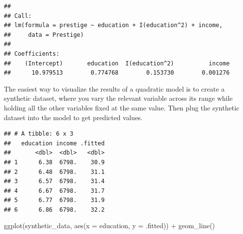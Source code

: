 \documentclass[
  12pt,
  oneside,openany]{book}
\newenvironment{Shaded}{\begin{snugshade}}{\end{snugshade}}
\newcommand{\AttributeTok}[1]{\textcolor[rgb]{0.77,0.63,0.00}{#1}}
\newcommand{\DecValTok}[1]{\textcolor[rgb]{0.00,0.00,0.81}{#1}}
\newcommand{\FunctionTok}[1]{\textcolor[rgb]{0.00,0.00,0.00}{#1}}
\newcommand{\NormalTok}[1]{#1}
\newcommand{\OtherTok}[1]{\textcolor[rgb]{0.56,0.35,0.01}{#1}}
\newcommand{\SpecialCharTok}[1]{\textcolor[rgb]{0.00,0.00,0.00}{#1}}
\begin{document}
\begin{verbatim}
## 
## Call:
## lm(formula = prestige ~ education + I(education^2) + income, 
##     data = Prestige)
## 
## Coefficients:
##    (Intercept)       education  I(education^2)          income  
##      10.979513        0.774768        0.153730        0.001276
\end{verbatim}

The easiest way to visualize the results of a quadratic model is to create a synthetic dataset, where you vary the relevant variable across its range while holding all the other variables fixed at the same value. Then plug the synthetic dataset into the model to get predicted values.

\begin{Shaded}
\end{Shaded}

\begin{verbatim}
## # A tibble: 6 x 3
##   education income .fitted
##       <dbl>  <dbl>   <dbl>
## 1      6.38  6798.    30.9
## 2      6.48  6798.    31.1
## 3      6.57  6798.    31.4
## 4      6.67  6798.    31.7
## 5      6.77  6798.    31.9
## 6      6.86  6798.    32.2
\end{verbatim}

\begin{Shaded}
\begin{Highlighting}[]
\FunctionTok{ggplot}\NormalTok{(synthetic\_data, }\FunctionTok{aes}\NormalTok{(}\AttributeTok{x =}\NormalTok{ education, }\AttributeTok{y =}\NormalTok{ .fitted)) }\SpecialCharTok{+}
    \FunctionTok{geom\_line}\NormalTok{()}
\end{Highlighting}
\end{Shaded}
\end{document}
